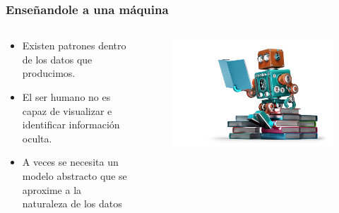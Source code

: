 \documentclass[10pt]{beamer}
\begin{document}
\begin{frame}
    \frametitle{Enseñandole a una máquina}
    \begin{columns}
        \begin{column}{0.4\textwidth}
          \begin{itemize}
              \item Existen patrones dentro de los datos que producimos.
              \item El ser humano no es capaz de visualizar e identificar información oculta.
              \item A veces se necesita un \alert{modelo abstracto} que se aproxime a la naturaleza de los datos
          \end{itemize}
        \end{column}
        \begin{column}{0.6\textwidth}
          \begin{figure}[!h] 
            \centering
            \includegraphics[width=1\textwidth]{img/robot1}
          \end{figure}  
        \end{column}
      \end{columns}

\end{frame}
\end{document}
